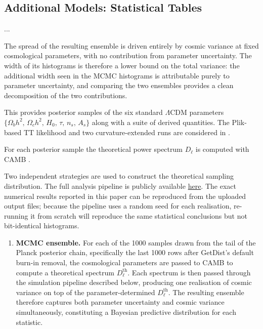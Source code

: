 \documentclass[apj,twocolumn,numberedappendix]{openjournal}
\begin{document}
\begin{appendix}


\section{Additional Models: Statistical Tables}\label{sec-appendix-tables}

...

The spread of the resulting ensemble is driven entirely by cosmic
variance at fixed cosmological parameters, with no contribution from
parameter uncertainty. The width of its histograms is therefore a
lower bound on the total variance: the additional width seen in the
MCMC histograms is attributable purely to parameter uncertainty, and
comparing the two ensembles provides a clean decomposition of the two
contributions.

This provides posterior samples of the six standard $\Lambda$CDM parameters $\{\Omega_b h^2,\,\Omega_c h^2,\,H_0,\,\tau,\,n_s,\,A_s\}$ along with a suite of derived quantities.
The Plik-based TT likelihood and two curvature-extended runs are considered in .

For each posterior sample the theoretical power spectrum $D_\ell$ is computed with CAMB \citep{CAMB_GitHub}.


Two independent strategies are used to construct the theoretical
sampling distribution. The full analysis pipeline is publicly available
\href{https://github.com/PhyAMR/CMB}{here}. The exact numerical results
reported in this paper can be reproduced from the uploaded output files;
because the pipeline uses a random seed for each realisation, re-running
it from scratch will reproduce the same statistical conclusions but not
bit-identical histograms.

\begin{enumerate}
	\item \textbf{MCMC ensemble.} For each of the 1000 samples drawn from the
	tail of the Planck posterior chain, specifically the last 1000 rows
	after GetDist's default burn-in removal, the cosmological parameters
	are passed to CAMB to compute a theoretical spectrum
	$D_\ell^\mathrm{th}$. Each spectrum is then passed through the
	simulation pipeline described below, producing one realisation of
	cosmic variance on top of the parameter-determined
	$D_\ell^\mathrm{th}$. The resulting ensemble therefore captures both
	parameter uncertainty and cosmic variance simultaneously, constituting
	a Bayesian predictive distribution for each statistic.
\end{enumerate}


\end{appendix}
\end{document}
